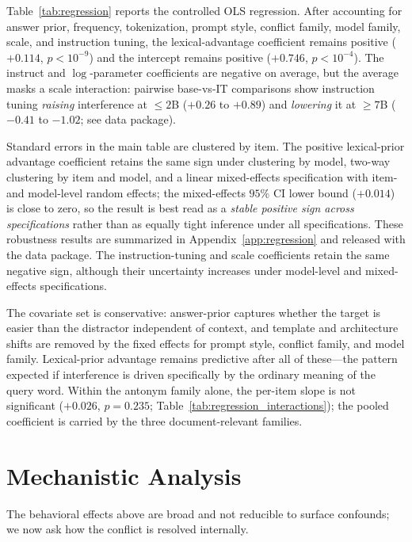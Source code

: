\documentclass[11pt]{article}
\begin{document}
Table~\ref{tab:regression} reports the controlled OLS regression.
After accounting for answer prior, frequency, tokenization, prompt style, conflict family,
model family, scale, and instruction tuning, the lexical-advantage coefficient remains positive
($+0.114$, $p < 10^{-9}$) and the intercept remains positive ($+0.746$, $p < 10^{-4}$).
The instruct and $\log$-parameter coefficients are negative on average, but the average masks
a scale interaction: pairwise base-vs-IT comparisons show instruction tuning \emph{raising}
interference at $\leq 2$B ($+0.26$ to $+0.89$) and \emph{lowering} it at $\geq 7$B ($-0.41$ to
$-1.02$; see data package).

Standard errors in the main table are clustered by item. The positive lexical-prior advantage
coefficient retains the same sign under clustering by model, two-way clustering by item and
model, and a linear mixed-effects specification with item- and model-level random effects; the
mixed-effects $95\%$ CI lower bound ($+0.014$) is close to zero, so the result is best read as a
\emph{stable positive sign across specifications} rather than as equally tight inference under
all specifications. These robustness results are summarized in Appendix~\ref{app:regression} and
released with the data package. The instruction-tuning and scale coefficients retain the same
negative sign, although their uncertainty increases under model-level and mixed-effects
specifications.

The covariate set is conservative: answer-prior captures whether the target is easier than the
distractor independent of context, and template and architecture shifts are removed by the
fixed effects for prompt style, conflict family, and model family. Lexical-prior advantage remains predictive after all of these---the pattern expected if
interference is driven specifically by the ordinary meaning of the query word. Within the
antonym family alone, the per-item slope is not significant
($+0.026$, $p=0.235$; Table~\ref{tab:regression_interactions}); the pooled coefficient is
carried by the three document-relevant families.


\section{Mechanistic Analysis}
\label{sec:mechanism}

The behavioral effects above are broad and not reducible to surface confounds; we now ask
how the conflict is resolved internally.
\end{document}
